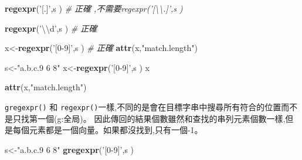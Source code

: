 \documentclass[]{book}
\newenvironment{Shaded}{\begin{snugshade}}{\end{snugshade}}
\newcommand{\KeywordTok}[1]{\textcolor[rgb]{0.13,0.29,0.53}{\textbf{#1}}}
\newcommand{\CharTok}[1]{\textcolor[rgb]{0.31,0.60,0.02}{#1}}
\newcommand{\StringTok}[1]{\textcolor[rgb]{0.31,0.60,0.02}{#1}}
\newcommand{\CommentTok}[1]{\textcolor[rgb]{0.56,0.35,0.01}{\textit{#1}}}
\newcommand{\NormalTok}[1]{#1}
\theoremstyle{definition}
\theoremstyle{definition}
\theoremstyle{definition}
\theoremstyle{remark}
\begin{document}
\begin{Shaded}
\begin{Highlighting}[]
\KeywordTok{regexpr}\NormalTok{(}\StringTok{'[.]'}\NormalTok{,s ) }\CommentTok{# 正確 ,不需要regexpr('[\textbackslash{}\textbackslash{}.]',s )}
\end{Highlighting}
\end{Shaded}

\begin{Shaded}
\begin{Highlighting}[]
\KeywordTok{regexpr}\NormalTok{(}\StringTok{'}\CharTok{\textbackslash{}\textbackslash{}}\StringTok{d'}\NormalTok{,s ) }\CommentTok{# 正確}
\end{Highlighting}
\end{Shaded}

\begin{Shaded}
\begin{Highlighting}[]
\NormalTok{x<-}\KeywordTok{regexpr}\NormalTok{(}\StringTok{'[0-9]'}\NormalTok{,s ) }\CommentTok{# 正確}
\KeywordTok{attr}\NormalTok{(x,}\StringTok{"match.length"}\NormalTok{)}
\end{Highlighting}
\end{Shaded}

\begin{Shaded}
\begin{Highlighting}[]
\NormalTok{s<-}\StringTok{"a.b.c.9 6 8"}
\NormalTok{x<-}\KeywordTok{regexpr}\NormalTok{(}\StringTok{'[0-9]'}\NormalTok{,s ) }
\NormalTok{x}
\end{Highlighting}
\end{Shaded}

\begin{Shaded}
\begin{Highlighting}[]
\KeywordTok{attr}\NormalTok{(x,}\StringTok{"match.length"}\NormalTok{)}
\end{Highlighting}
\end{Shaded}

\texttt{gregexpr()} 和
\texttt{regexpr()}一樣,不同的是會在目標字串中搜尋所有符合的位置而不是只找第一個(g:全局)。
因此傳回的結果個數雖然和查找的串列元素個數一樣,但是每個元素都是一個向量。如果都沒找到,只有一個-1。

\begin{Shaded}
\begin{Highlighting}[]
\NormalTok{s<-}\StringTok{"a.b.c.9 6 8"}
 \KeywordTok{gregexpr}\NormalTok{(}\StringTok{'[0-9]'}\NormalTok{,s ) }
\end{Highlighting}
\end{Shaded}
\end{document}
